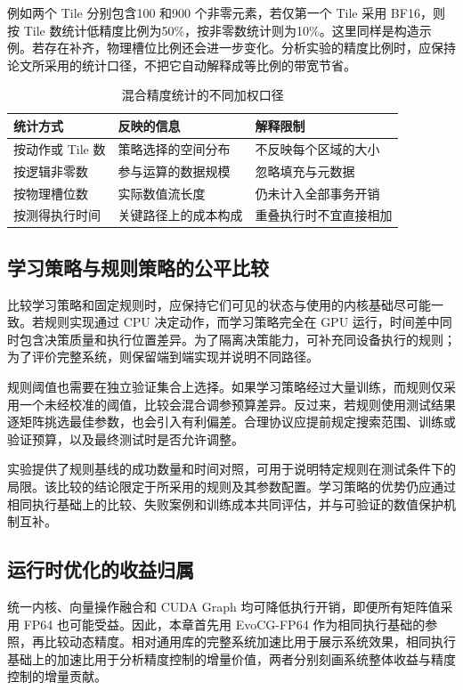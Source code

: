 例如两个 Tile 分别包含100 和900 个非零元素，若仅第一个 Tile 采用 BF16，则按 Tile 数统计低精度比例为50\%，按非零数统计则为10\%。这里同样是构造示例。若存在补齐，物理槽位比例还会进一步变化。分析实验的精度比例时，应保持论文所采用的统计口径，不把它自动解释成等比例的带宽节省。

\begin{table}[htbp]\centering\caption{混合精度统计的不同加权口径}
\begin{tabularx}{\textwidth}{p{2.8cm}XX}\toprule
统计方式&反映的信息&解释限制\\\midrule
按动作或 Tile 数&策略选择的空间分布&不反映每个区域的大小\\
按逻辑非零数&参与运算的数据规模&忽略填充与元数据\\
按物理槽位数&实际数值流长度&仍未计入全部事务开销\\
按测得执行时间&关键路径上的成本构成&重叠执行时不宜直接相加\\\bottomrule
\end{tabularx}\end{table}

\subsection{学习策略与规则策略的公平比较}
比较学习策略和固定规则时，应保持它们可见的状态与使用的内核基础尽可能一致。若规则实现通过 CPU 决定动作，而学习策略完全在 GPU 运行，时间差中同时包含决策质量和执行位置差异。为了隔离决策能力，可补充同设备执行的规则；为了评价完整系统，则保留端到端实现并说明不同路径。

规则阈值也需要在独立验证集合上选择。如果学习策略经过大量训练，而规则仅采用一个未经校准的阈值，比较会混合调参预算差异。反过来，若规则使用测试结果逐矩阵挑选最佳参数，也会引入有利偏差。合理协议应提前规定搜索范围、训练或验证预算，以及最终测试时是否允许调整。

实验提供了规则基线的成功数量和时间对照，可用于说明特定规则在测试条件下的局限。该比较的结论限定于所采用的规则及其参数配置。学习策略的优势仍应通过相同执行基础上的比较、失败案例和训练成本共同评估，并与可验证的数值保护机制互补。

\subsection{运行时优化的收益归属}
统一内核、向量操作融合和 CUDA Graph 均可降低执行开销，即便所有矩阵值采用 FP64 也可能受益。因此，本章首先用 EvoCG-FP64 作为相同执行基础的参照，再比较动态精度。相对通用库的完整系统加速比用于展示系统效果，相同执行基础上的加速比用于分析精度控制的增量价值，两者分别刻画系统整体收益与精度控制的增量贡献。

